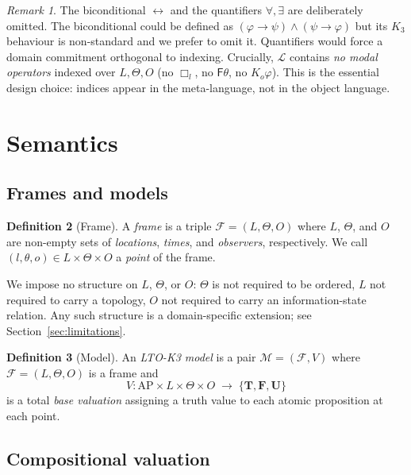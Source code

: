 \documentclass[11pt,a4paper]{article}
\theoremstyle{definition}
\newtheorem{definition}{Definition}
\theoremstyle{plain}
\theoremstyle{remark}
\newtheorem{remark}[definition]{Remark}
\newcommand{\Tv}{\mathbf{T}}
\newcommand{\Fv}{\mathbf{F}}
\newcommand{\Uv}{\mathbf{U}}
\newcommand{\Vals}{\{\Tv, \Fv, \Uv\}}
\newcommand{\frm}{(l, \theta, o)}
\newcommand{\Lang}{\mathcal{L}}
\newcommand{\AP}{\mathrm{AP}}
\newcommand{\Mod}{\mathcal{M}}
\newcommand{\Frame}{\mathcal{F}}
\begin{document}
\begin{remark}
The biconditional $\leftrightarrow$ and the quantifiers $\forall, \exists$
are deliberately omitted. The biconditional could be defined as
$(\varphi \to \psi) \land (\psi \to \varphi)$ but its $K_3$ behaviour is
non-standard and we prefer to omit it. Quantifiers would force a domain
commitment orthogonal to indexing. Crucially, $\Lang$ contains \emph{no
modal operators} indexed over $L, \Theta, O$ (no $\Box_l$, no
$\mathsf{F}\theta$, no $K_o\varphi$). This is the essential design
choice: indices appear in the meta-language, not in the object language.
\end{remark}

\section{Semantics}
\label{sec:semantics}

\subsection{Frames and models}

\begin{definition}[Frame]
A \emph{frame} is a triple $\Frame = (L, \Theta, O)$ where $L$, $\Theta$,
and $O$ are non-empty sets of \emph{locations}, \emph{times}, and
\emph{observers}, respectively. We call $\frm \in L \times \Theta \times O$
a \emph{point} of the frame.
\end{definition}

We impose no structure on $L$, $\Theta$, or $O$: $\Theta$ is not required
to be ordered, $L$ not required to carry a topology, $O$ not required to
carry an information-state relation. Any such structure is a
domain-specific extension; see Section~\ref{sec:limitations}.

\begin{definition}[Model]
An \emph{LTO-K3 model} is a pair $\Mod = (\Frame, V)$ where
$\Frame = (L, \Theta, O)$ is a frame and
\[
V : \AP \times L \times \Theta \times O \;\longrightarrow\; \Vals
\]
is a total \emph{base valuation} assigning a truth value to each atomic
proposition at each point.
\end{definition}

\subsection{Compositional valuation}
\end{document}
